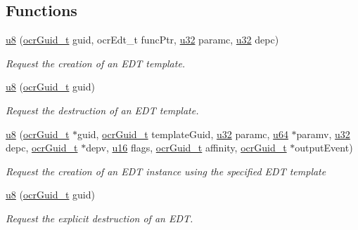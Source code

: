 \subsection*{Functions}
\begin{DoxyCompactItemize}
\item
  \hyperlink{type_u8}{u8} \hyperlink{func_ocrEdtTemplateCreate}
            {}(\hyperlink{type_ocrGuid_t}{ocr\-Guid\-\_\-t} guid,
    ocrEdt\_t funcPtr, \hyperlink{type_u32}{u32} paramc, \hyperlink{type_u32}{u32} depc)
    \begin{DoxyCompactList}
      \small\item \emph{Request the creation of an EDT template.}
    \end{DoxyCompactList}
\item
  \hyperlink{type_u8}{u8} \hyperlink{func_ocrEdtTemplateDestroy}
            {}(\hyperlink{type_ocrGuid_t}{ocr\-Guid\-\_\-t} guid)
  \begin{DoxyCompactList}
    \small\item \emph{Request the destruction of an EDT template.}
  \end{DoxyCompactList}
\item
  \hyperlink{type_u8}{u8} \hyperlink{func_ocrEdtCreate}
            {}(\hyperlink{type_ocrGuid_t}{ocr\-Guid\-\_\-t} $\ast$guid,
    \hyperlink{type_ocrGuid_t}{ocr\-Guid\-\_\-t} template\-Guid,
    \hyperlink{type_u32}{u32} paramc, \hyperlink{type_u64}{u64} $\ast$paramv,
    \hyperlink{type_u32}{u32} depc, \hyperlink{type_ocrGuid_t}{ocr\-Guid\-\_\-t} $\ast$depv,
    \hyperlink{type_u16}{u16} flags, \hyperlink{type_ocrGuid_t}{ocr\-Guid\-\_\-t} affinity,
    \hyperlink{type_ocrGuid_t}{ocr\-Guid\-\_\-t} $\ast$output\-Event)
    \begin{DoxyCompactList}
      \small\item \emph{Request the creation of an EDT instance using
        the specified EDT template}
    \end{DoxyCompactList}
\item
  \hyperlink{type_u8}{u8} \hyperlink{func_ocrEdtDestroy}
            {}(\hyperlink{type_ocrGuid_t}{ocr\-Guid\-\_\-t} guid)
    \begin{DoxyCompactList}
      \small\item \emph{Request the explicit destruction of an EDT.}
    \end{DoxyCompactList}
\end{DoxyCompactItemize}
%
